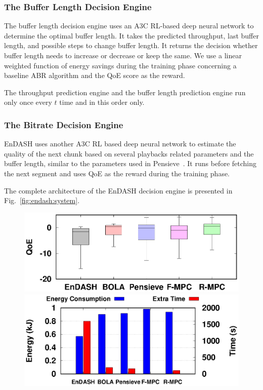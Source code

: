 \subsubsection{The Buffer Length Decision Engine}
The buffer length decision engine uses an A3C RL-based deep neural network to determine the optimal buffer length. It takes the predicted throughput, last buffer length, and possible steps to change buffer length. It returns the decision whether buffer length needs to increase or decrease or keep the same. We use a linear weighted function of energy savings during the training phase concerning a baseline ABR algorithm and the QoE score as the reward.

The throughput prediction engine and the buffer length prediction engine run only once every $t$ time and in this order only.

\subsubsection{The Bitrate Decision Engine}
EnDASH uses another A3C RL based deep neural network to estimate the quality of the next chunk based on several playbacks related parameters and the buffer length, similar to the parameters used in Pensieve~\cite{mao2017neural}. It runs before fetching the next segment and uses QoE as the reward during the training phase.

The complete architecture of the EnDASH decision engine is presented in Fig.~\ref{fig:endash:system}.

\begin{figure}[!h]
	\begin{minipage}[t]{0.48\linewidth}
		\includegraphics[width=\linewidth]{img/EnDASH/QoE}
		\caption{\label{fig:endash:qoe}}
	\end{minipage}\hfill
	\begin{minipage}[t]{0.48\linewidth}
		\includegraphics[width=\linewidth]{img/EnDASH/EnergyConsumption}
		\caption{\label{fig:endash:energy}}
	\end{minipage}
\end{figure}
